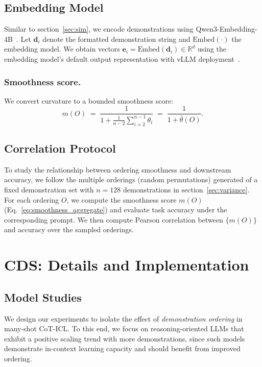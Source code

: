 \documentclass{llmxive}
\begin{document}
\subsection{Embedding Model}
\label{sec:embedding_details}
Similar to section~\ref{sec:sim}, we encode demonstrations using Qwen3-Embedding-4B~\cite{zhang2025qwen3embeddingadvancingtext}.
Let $\mathbf{d}_i$ denote the formatted demonstration string and $\mathrm{Embed}(\cdot)$ the embedding model.
We obtain vectors $\mathbf{e}_i = \mathrm{Embed}(\mathbf{d}_i) \in \mathbb{R}^d$ using the embedding model's default output representation with vLLM deployment~\cite{vllm}. 








\subsubsection{Smoothness score.}
We convert curvature to a bounded smoothness score:
\begin{equation}
m(O) \;=\; \frac{1}{1 + \frac{1}{n-2}\sum_{i=2}^{n-1}\theta_i}
\;=\;
\frac{1}{1+\bar{\theta}(O)}.
\end{equation}


\subsection{Correlation Protocol}
\label{sec:correlation_protocol}
To study the relationship between ordering smoothness and downstream accuracy, we follow the multiple orderings (random permutations) generated of a fixed demonstration set with $n=128$ demonstrations in section~\ref{sec:variance}.
For each ordering $O$, we compute the smoothness score $m(O)$ (Eq.~\eqref{eq:smoothness_aggregate}) and evaluate task accuracy under the corresponding prompt.
We then compute Pearson correlation between $\{m(O)\}$ and accuracy over the sampled orderings.


\section{CDS: Details and
Implementation}
\subsection{Model Studies}
\label{sec:exp_setting}
We design our experiments to isolate the effect of \emph{demonstration ordering} in many-shot CoT-ICL.
To this end, we focus on reasoning-oriented LLMs that exhibit a positive scaling trend with more demonstrations, since such models demonstrate in-context learning capacity and should benefit from improved ordering.
\end{document}
